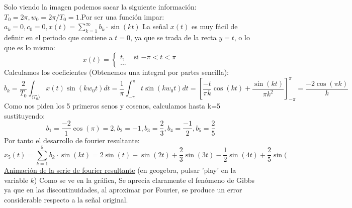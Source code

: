 \documentclass[12pt,a4paper,oneside,onecolumn]{article}
\begin{document}
    \section{}
    Solo viendo la imagen podemos sacar la siguiente informaci\'on: $T_0 = 2\pi , w_0 = 2\pi /T_0 = 1$.\newline Por ser una funci\'on impar: $a_k = 0, c_0 = 0, x(t) = \sum_{k = 1}^{\infty}{b_k \cdot \sin{(kt)}}$ \newpage
    La se\~nal $x(t)$ es muy f\'acil de definir en el periodo que contiene a $t =0$, ya que se trada de la recta $y = t$, o lo que es lo mismo:
    \[
        x(t) = \begin{cases}
            t, & \text{ si $-\pi < t < \pi$}  \\
            ...
        \end{cases}
    \]
    Calculamos los coeficientes (Obtenemos una integral por partes sencilla):
    \[
        b_k = \frac{2}{T_0}\int_{\langle T_0 \rangle}{x(t)\sin{(k w_0 t)}}dt = \frac{1}{\pi}\int_{-\pi}^{\pi}{t\sin{(k w_0 t)}}dt = \left[\frac{-t}{\pi k}\cos{(k t)} + \frac{\sin{(k t)}}{\pi k^2}\right]^\pi_{-\pi} = \frac{-2 \cos{(\pi k)}}{k}
    \]
    Como nos piden los 5 primeros senos y cosenos, calculamos hasta k=5 sustituyendo:
    \[
        b_1 = \frac{-2}{1}\cos{(\pi)} = 2, b_2 = -1, b_3 = \frac{2}{3}, b_4 = \frac{-1}{2}, b_5 = \frac{2}{5}
    \]
    Por tanto el desarrollo de fourier resultante:
    \[
        x_5(t) = \sum_{k = 1}^{5}{b_k \cdot \sin{(kt)}} = 2\sin{(t)} -\sin{(2t)} + \frac{2}{3}\sin{(3t)} - \frac{1}{2}\sin{(4t)} + \frac{2}{5}\sin{(}
    \]
    \href{https://www.geogebra.org/calculator/btne8shm}{\underline {Animaci\'on de la serie de fourier resultante}}  (en geogebra, pulsar 'play' en la variable $k$)
    Como se ve en la gr\'afica, Se aprecia claramente el fen\'omeno de Gibbs ya que en las discontinuidades, al aproximar por Fourier, se produce un error considerable respecto a la se\~nal original.
    
\end{document}
